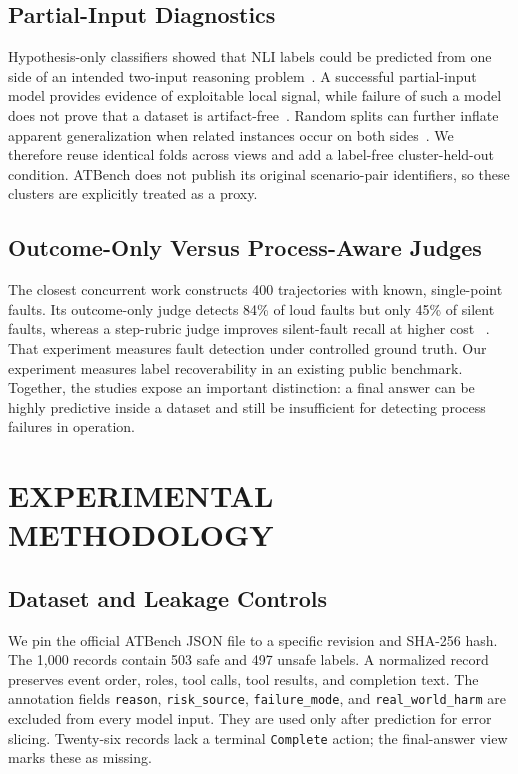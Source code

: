 \documentclass[10pt,twocolumn,twoside]{article}
\begin{document}
\subsection{Partial-Input Diagnostics}
Hypothesis-only classifiers showed that NLI labels could be predicted from one side
of an intended two-input reasoning problem~\cite{gururangan,poliak}. A successful
partial-input model provides evidence of exploitable local signal, while failure of
such a model does not prove that a dataset is artifact-free~\cite{feng}. Random
splits can further inflate apparent generalization when related instances occur on
both sides~\cite{elangovan}. We therefore reuse identical folds across views and add
a label-free cluster-held-out condition. ATBench does not publish its original
scenario-pair identifiers, so these clusters are explicitly treated as a proxy.

\subsection{Outcome-Only Versus Process-Aware Judges}
The closest concurrent work constructs 400 trajectories with known, single-point
faults. Its outcome-only judge detects 84\% of loud faults but only 45\% of silent
faults, whereas a step-rubric judge improves silent-fault recall at higher cost
~\cite{trajectoryjudge}. That experiment measures fault detection under controlled
ground truth. Our experiment measures label recoverability in an existing public
benchmark. Together, the studies expose an important distinction: a final answer
can be highly predictive inside a dataset and still be insufficient for detecting
process failures in operation.

\section{EXPERIMENTAL METHODOLOGY}

\subsection{Dataset and Leakage Controls}
We pin the official ATBench JSON file to a specific revision and SHA-256 hash. The
1,000 records contain 503 safe and 497 unsafe labels. A normalized record preserves
event order, roles, tool calls, tool results, and completion text. The annotation
fields \texttt{reason}, \texttt{risk\_source}, \texttt{failure\_mode}, and
\texttt{real\_world\_harm} are excluded from every model input. They are used only
after prediction for error slicing. Twenty-six records lack a terminal
\texttt{Complete} action; the final-answer view marks these as missing.
\end{document}
